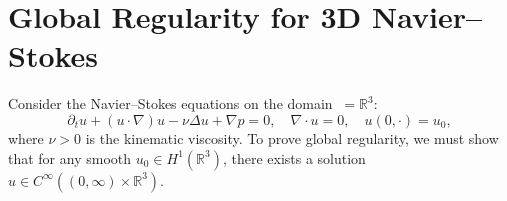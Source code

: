 \documentclass[11pt,a4paper]{amsart}
\begin{document}
\section{Global Regularity for 3D Navier--Stokes}
Consider the Navier--Stokes equations on the domain $\ = \mathbb{R}^3$:
\begin{equation}
 \partial_t u + (u \cdot \nabla) u - \nu \Delta u + \nabla p = 0, 
 \quad \nabla \cdot u = 0, 
 \quad u(0, \cdot) = u_0,
\end{equation}
where $\nu > 0$ is the kinematic viscosity. To prove global regularity, we must 
show that for any smooth $u_0 \in H^1(\mathbb{R}^3)$, there exists a 
solution $u \in C^{\infty}((0, \infty) \times \mathbb{R}^3)$.
\end{document}

